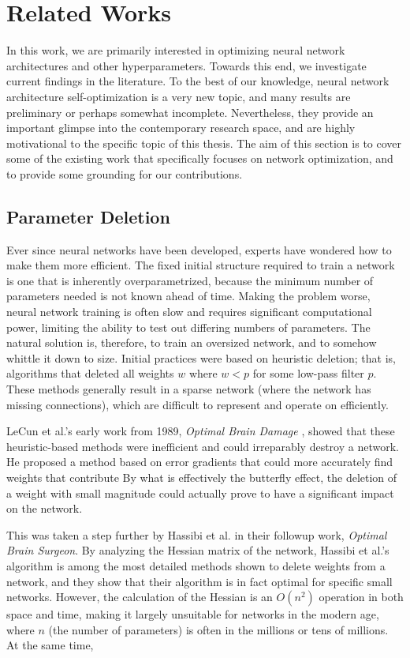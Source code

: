 \chapter{Related Works}

In this work, we are primarily interested in optimizing neural network architectures and other hyperparameters.
Towards this end, we investigate current findings in the literature.
To the best of our knowledge, neural network architecture self-optimization is a very new topic, and many results are preliminary or perhaps somewhat incomplete.
Nevertheless, they provide an important glimpse into the contemporary research space, and are highly motivational to the specific topic of this thesis.
The aim of this section is to cover some of the existing work that specifically focuses on network optimization, and to provide some grounding for our contributions.

\section{Parameter Deletion}
Ever since neural networks have been developed, experts have wondered how to make them more efficient.
The fixed initial structure required to train a network is one that is inherently overparametrized, because the minimum number of parameters needed is not known ahead of time.
Making the problem worse, neural network training is often slow and requires significant computational power, limiting the ability to test out differing numbers of parameters.
The natural solution is, therefore, to train an oversized network, and to somehow whittle it down to size.
Initial practices were based on heuristic deletion; that is, algorithms that deleted all weights $w$ where $w < p$ for some low-pass filter $p$.
These methods generally result in a sparse network (where the network has missing connections), which are difficult to represent and operate on efficiently.

LeCun et al.'s early work from 1989, \emph{Optimal Brain Damage} \cite{lecun1989optimal}, showed that these heuristic-based methods were inefficient and could irreparably destroy a network.
He proposed a method based on error gradients that could more accurately find weights that contribute 
By what is effectively the butterfly effect, the deletion of a weight with small magnitude could actually prove to have a significant impact on the network.

This was taken a step further by Hassibi et al. \cite{hassibi1993second} in their followup work, \emph{Optimal Brain Surgeon}.
By analyzing the Hessian matrix of the network, 
Hassibi et al.'s algorithm is among the most detailed methods shown to delete weights from a network, and they show that their algorithm is in fact optimal for specific small networks.
However, the calculation of the Hessian is an $O(n^2)$ operation in both space and time, making it largely unsuitable for networks in the modern age, where $n$ (the number of parameters) is often in the millions or tens of millions.
At the same time,

